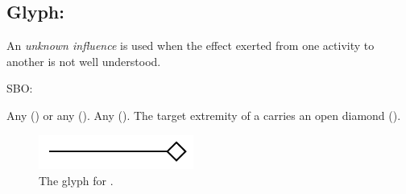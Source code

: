 \subsection{Glyph: }
\label{sec:af:unknown_infl}

An \emph{unknown influence} is used when the effect exerted from one activity to another is not well understood. 

\begin{glyphDescription}

\glyphSboTerm SBO:

 \glyphOrigin Any  () or any  ().
 \glyphTarget Any  ().
 \glyphEndPoint The target extremity of a  carries an open diamond ().


\end{glyphDescription}

\begin{figure}[H]
  \centering
  \includegraphics[width = 2in]{images/unknownInfluence}
  \caption{The \AF glyph for .}
  \label{fig:af:unknownInfl}
\end{figure}


